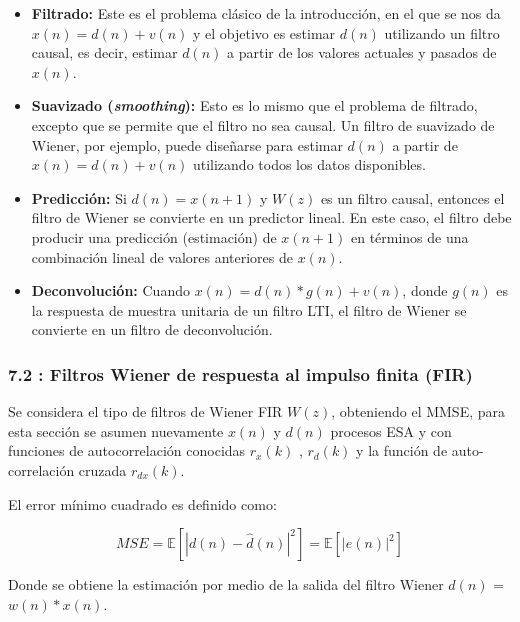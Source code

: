 \documentclass[a4paper]{article}
\begin{document}
\begin{itemize}
	\item \textbf{Filtrado:} Este es el problema clásico de la introducción, en el que se nos da $x(n) = d(n) + v(n)$ y el objetivo es estimar $d(n)$ utilizando un filtro causal, es decir, estimar $d(n)$ a partir de los valores actuales y pasados de $x(n)$.
	
	\item \textbf{Suavizado (\textit{smoothing}):} Esto es lo mismo que el problema de filtrado, excepto que se permite que el filtro no sea causal. Un filtro de suavizado de Wiener, por ejemplo, puede diseñarse para estimar $d(n)$ a partir de $x(n) = d(n) + v(n)$ utilizando todos los datos disponibles.
	
	\item \textbf{Predicción:} Si $d(n) = x(n + 1)$ y $W(z)$ es un filtro causal, entonces el filtro de Wiener se convierte en un predictor lineal. En este caso, el filtro debe producir una predicción (estimación) de $x(n + 1)$ en términos de una combinación lineal de valores anteriores de $x(n)$.
	
	\item \textbf{Deconvolución:} Cuando $x(n) = d(n) \ast g(n) + v(n)$, donde $g(n)$ es la respuesta de muestra unitaria de un filtro LTI, el filtro de Wiener se convierte en un filtro de deconvolución.
\end{itemize}


\subsubsection*{7.2 : Filtros Wiener de respuesta al impulso finita (FIR)}


Se considera el tipo de filtros de Wiener FIR $W(z)$, obteniendo el MMSE, para esta sección se asumen nuevamente $x(n)$ y $d(n)$ procesos ESA y con funciones de autocorrelación conocidas $r_x(k)$ , $r_{d}(k)$ y la función de auto-correlación cruzada $r_{dx}(k)$.

El error mínimo cuadrado es definido como:

\begin{equation}
	MSE = \mathbb{E}[|d(n)- \hat{d}(n)|^2] =  \mathbb{E}[|e(n)|^2]
\end{equation}

Donde se obtiene la estimación por medio de la salida del filtro Wiener $\hat{d}(n)$ = $w(n) \ast x(n) $. 
 
\end{document}
